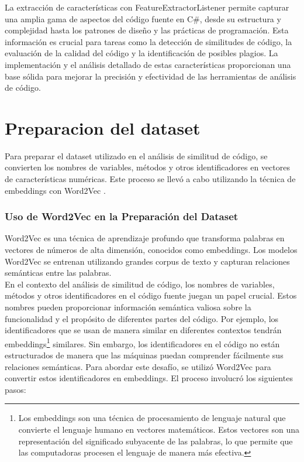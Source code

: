         
La extracción de características con FeatureExtractorListener permite capturar una amplia gama de aspectos del código fuente en C\#, desde su estructura y complejidad hasta los patrones de diseño y las prácticas de programación. Esta información es crucial para tareas como la detección de similitudes de código, la evaluación de la calidad del código y la identificación de posibles plagios. La implementación y el análisis detallado de estas características proporcionan una base sólida para mejorar la precisión y efectividad de las herramientas de análisis de código.

\section{Preparacion del dataset}

Para preparar el dataset utilizado en el análisis de similitud de código, se convierten los nombres de variables, métodos y otros identificadores en vectores de características numéricas. Este proceso se llevó a cabo utilizando la técnica de embeddings con Word2Vec \cite{mikolov2013efficient}. \\

\subsubsection{Uso de Word2Vec en la Preparación del Dataset}
Word2Vec es una técnica de aprendizaje profundo que transforma palabras en vectores de números de alta dimensión, conocidos como embeddings. Los modelos Word2Vec se entrenan utilizando grandes corpus de texto y capturan relaciones semánticas entre las palabras.  \\

En el contexto del análisis de similitud de código, los nombres de variables, métodos y otros identificadores en el código fuente juegan un papel crucial. Estos nombres pueden proporcionar información semántica valiosa sobre la funcionalidad y el propósito de diferentes partes del código. Por ejemplo, los identificadores que se usan de manera similar en diferentes contextos tendrán embeddings\footnote{Los embeddings son una técnica de procesamiento de lenguaje natural que convierte el lenguaje humano en vectores matemáticos. Estos vectores son una representación del significado subyacente de las palabras, lo que permite que las computadoras procesen el lenguaje de manera más efectiva.} similares. Sin embargo, los identificadores en el código no están estructurados de manera que las máquinas puedan comprender fácilmente sus relaciones semánticas. Para abordar este desafío, se utilizó Word2Vec para convertir estos identificadores en embeddings. El proceso involucró los siguientes pasos:

